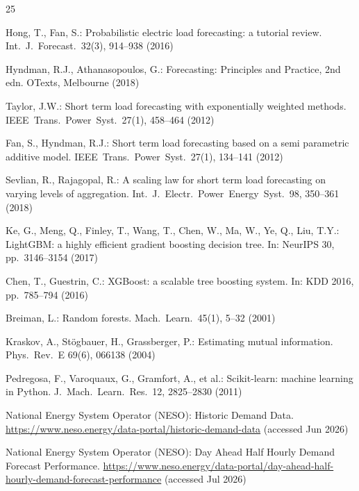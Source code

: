 \documentclass[runningheads]{llncs}
\begin{document}
\begin{thebibliography}{25}
\small
\setlength{\itemsep}{0pt}
\setlength{\parskip}{0pt}

Hong, T., Fan, S.: Probabilistic electric load forecasting: a tutorial review. Int.\ J.\ Forecast.\ 32(3), 914--938 (2016)

Hyndman, R.J., Athanasopoulos, G.: Forecasting: Principles and Practice, 2nd edn. OTexts, Melbourne (2018)

Taylor, J.W.: Short term load forecasting with exponentially weighted methods. IEEE\ Trans.\ Power\ Syst.\ 27(1), 458--464 (2012)

Fan, S., Hyndman, R.J.: Short term load forecasting based on a semi parametric additive model. IEEE\ Trans.\ Power\ Syst.\ 27(1), 134--141 (2012)

Sevlian, R., Rajagopal, R.: A scaling law for short term load forecasting on varying levels of aggregation. Int.\ J.\ Electr.\ Power\ Energy\ Syst.\ 98, 350--361 (2018)

Ke, G., Meng, Q., Finley, T., Wang, T., Chen, W., Ma, W., Ye, Q., Liu, T.Y.: {LightGBM}: a highly efficient gradient boosting decision tree. In: NeurIPS 30, pp.\ 3146--3154 (2017)

Chen, T., Guestrin, C.: {XGBoost}: a scalable tree boosting system. In: KDD 2016, pp.\ 785--794 (2016)

Breiman, L.: Random forests. Mach.\ Learn.\ 45(1), 5--32 (2001)

Kraskov, A., St{\"o}gbauer, H., Grassberger, P.: Estimating mutual information. Phys.\ Rev.\ E 69(6), 066138 (2004)

Pedregosa, F., Varoquaux, G., Gramfort, A., et al.: Scikit-learn: machine learning in {P}ython. J.\ Mach.\ Learn.\ Res.\ 12, 2825--2830 (2011)

National Energy System Operator ({NESO}): Historic Demand Data. \url{https://www.neso.energy/data-portal/historic-demand-data} (accessed Jun 2026)

National Energy System Operator ({NESO}): Day Ahead Half Hourly Demand Forecast Performance. \url{https://www.neso.energy/data-portal/day-ahead-half-hourly-demand-forecast-performance} (accessed Jul 2026)


\end{thebibliography}
\end{document}
